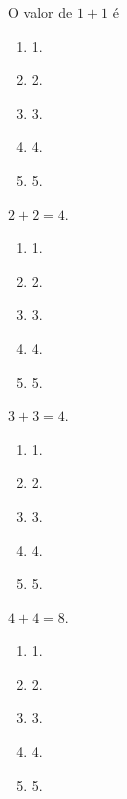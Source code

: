 \documentclass[oneside,a4paper]{amsart}
\begin{document}

\thispagestyle{empty}

\vspace{1cm}

\begin{questao}
  O valor de $1+1$ é
  \begin{enumerate}[\bf a.]
    \item 1.
    \item 2.
    \item 3.
    \item 4.
    \item 5.
  \end{enumerate}
\end{questao}

\begin{questao}
  $2+2=4$.
  \begin{enumerate}[\bf a.]
    \item 1.
    \item 2.
    \item 3.
    \item 4.
    \item 5.
  \end{enumerate}
\end{questao}

\begin{questao}
  $3+3=4$.
  \begin{enumerate}[\bf a.]
    \item 1.
    \item 2.
    \item 3.
    \item 4.
    \item 5.
  \end{enumerate}
\end{questao}

\begin{questao} 
  $4+4=8$.
  \begin{enumerate}[\bf a.]
    \item 1.
    \item 2.
    \item 3.
    \item 4.
    \item 5.
  \end{enumerate}
\end{questao}
\end{document}
